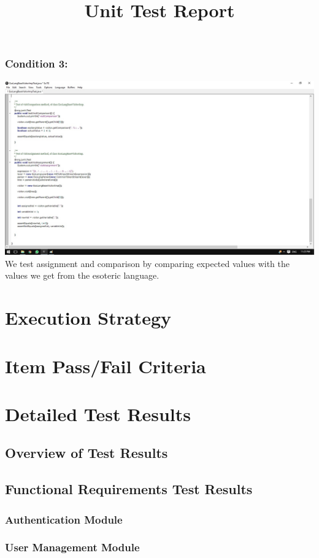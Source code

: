 \documentclass[english]{article}
\begin{document}
			\subsubsection{Condition 3: }
			\includegraphics[width=\linewidth]{test4.jpg}
			\\[12pt]
			We test assignment and comparison by comparing expected values with the values we get from the esoteric language.	
	
	\section{Execution Strategy}
	\section{Item Pass/Fail Criteria}
	
	\newpage
	\title{Unit Test Report}
\section{Detailed Test Results}
\subsection{Overview of Test Results}
\subsection{Functional Requirements Test Results}
	\subsubsection{Authentication Module}
	\subsubsection{User Management Module}
\end{document}

